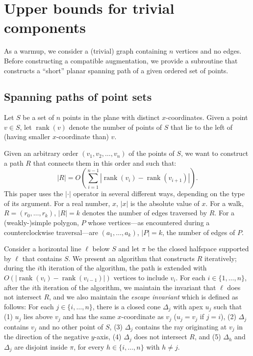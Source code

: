 \documentclass{patmorin}
\DeclareMathOperator{\rank}{rank}
\begin{document}
\section{Upper bounds for trivial components}\label{section:Trivial components}
As a warmup, we consider a (trivial) graph containing $n$ vertices and no edges.
Before constructing a compatible augmentation, we provide a subroutine
that constructs a ``short'' planar spanning path of a given ordered set of points.

\subsection{Spanning paths of point sets}
Let $S$ be a set of $n$ points in the plane with distinct $x$-coordinates. 
Given a point $v\in S$, let $\rank(v)$ denote the number of points of $S$ that lie to the left of (having smaller $x$-coordinate than) $v$.

Given an arbitrary order $(v_1, v_2, \ldots, v_n)$ of the points of $S$, we want to construct a path $R$ that connects them in this order and such that:  
\[
   |R|  = O\left(\sum_{i=1}^{n-1} |\rank(v_i) - \rank(v_{i+1})| \right).
\]
This paper uses the $|\cdot|$ operator in several different ways, depending on the type of its argument.  For a real number, $x$, $|x|$ is the absolute value of $x$.  For a walk, $R=(r_0,\ldots,r_k)$, $|R|=k$ denotes the number of edges traversed by $R$. For a (weakly-)simple polygon, $P$ whose vertices---as encountered during a counterclockwise traversal---are $(a_1,\ldots,a_k)$, $|P|=k$, the number of edges of $P$.

Consider a horizontal line $\ell$ below $S$ and let $\pi$ be the closed halfspace supported by $\ell$ that contains $S$.  We present an algorithm that constructs $R$ iteratively; during the $i$th iteration of the algorithm, the path is extended with $O(|\rank(v_i) - \rank(v_{i-1})|)$ vertices to include $v_i$.  For each $i\in \{1,\dots,n\}$, after the $i$th iteration of the algorithm, we maintain the invariant that $\ell$ does not intersect $R$, and we also maintain the \emph{escape invariant} which is defined as follows:
For each $j\in \{i, \dots, n\}$, there is a closed cone $\Delta_{j}$ with apex $u_{j}$ such that (1) $u_j$ lies above $v_j$ and has the same $x$-coordinate as $v_j$ ($u_j =v_j$ if $j = i$), (2) $\Delta_j$ contains $v_j$ and no other point of $S$, (3) $\Delta_j$ contains the ray originating at $v_j$ in the direction of the negative $y$-axis, (4) $\Delta_j$ does not intersect $R$, and (5) $\Delta_h$ and $\Delta_j$ are disjoint inside $\pi$, for every $h\in \{i,\dots,n\}$ with $h\neq j$.
\end{document}
